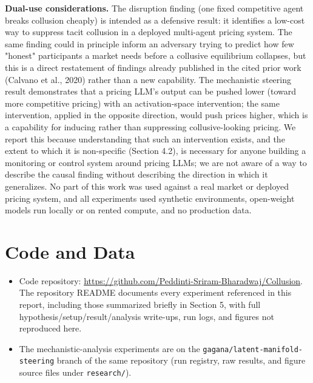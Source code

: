 \documentclass[11pt]{article}
\begin{document}
\textbf{Dual-use considerations.} The disruption finding (one fixed competitive agent breaks collusion cheaply) is intended as a defensive result: it identifies a low-cost way to suppress tacit collusion in a deployed multi-agent pricing system. The same finding could in principle inform an adversary trying to predict how few "honest" participants a market needs before a collusive equilibrium collapses, but this is a direct restatement of findings already published in the cited prior work (Calvano et al., 2020) rather than a new capability. The mechanistic steering result demonstrates that a pricing LLM's output can be pushed lower (toward more competitive pricing) with an activation-space intervention; the same intervention, applied in the opposite direction, would push prices higher, which is a capability for inducing rather than suppressing collusive-looking pricing. We report this because understanding that such an intervention exists, and the extent to which it is non-specific (Section 4.2), is necessary for anyone building a monitoring or control system around pricing LLMs; we are not aware of a way to describe the causal finding without describing the direction in which it generalizes. No part of this work was used against a real market or deployed pricing system, and all experiments used synthetic environments, open-weight models run locally or on rented compute, and no production data.

\section*{Code and Data}
\begin{itemize}[leftmargin=1.4em]
\item Code repository: \url{https://github.com/Peddinti-Sriram-Bharadwaj/Collusion}. The repository README documents every experiment referenced in this report, including those summarized briefly in Section 5, with full hypothesis/setup/result/analysis write-ups, run logs, and figures not reproduced here.
\item The mechanistic-analysis experiments are on the \texttt{gagana/latent-manifold-steering} branch of the same repository (run registry, raw results, and figure source files under \texttt{research/}).
\end{itemize}
\end{document}
